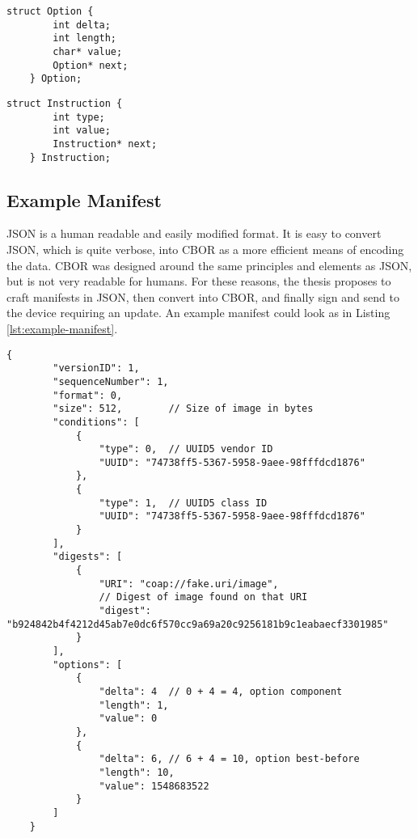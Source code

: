 \documentclass[0-thesis.tex]{subfiles}
\begin{document}
\begin{lstlisting}[caption={The format of the option field.}, 
                    label={lst:option-struct}]
    struct Option {
        int delta;
        int length;
        char* value;
        Option* next;
    } Option;
\end{lstlisting}

\begin{lstlisting}[caption={The format of directives or processing steps.}, 
                    label={lst:instruction}]
    struct Instruction {
        int type;
        int value;
        Instruction* next;
    } Instruction;
\end{lstlisting}

\subsection{Example Manifest}
\label{ssec:example-manifest}
JSON is a human readable and easily modified format. It is easy to convert JSON, which is
quite verbose, into CBOR as a more efficient means of encoding the data. CBOR was designed
around the same principles and elements as JSON, but is not very readable for humans. For
these reasons, the thesis proposes to craft manifests in JSON, then convert into CBOR, and
finally sign and send to the device requiring an update. An example manifest could look as
in Listing \ref{lst:example-manifest}.

\begin{lstlisting}[caption={An example manifest.},
                    label={lst:example-manifest}]
    {
        "versionID": 1,
        "sequenceNumber": 1,
        "format": 0,
        "size": 512,        // Size of image in bytes
        "conditions": [
            {
                "type": 0,  // UUID5 vendor ID
                "UUID": "74738ff5-5367-5958-9aee-98fffdcd1876"
            },
            {
                "type": 1,  // UUID5 class ID
                "UUID": "74738ff5-5367-5958-9aee-98fffdcd1876"
            }
        ],
        "digests": [
            {
                "URI": "coap://fake.uri/image",
                // Digest of image found on that URI
                "digest": "b924842b4f4212d45ab7e0dc6f570cc9a69a20c9256181b9c1eabaecf3301985"
            }
        ],
        "options": [
            {
                "delta": 4  // 0 + 4 = 4, option component
                "length": 1,
                "value": 0
            },
            {
                "delta": 6, // 6 + 4 = 10, option best-before
                "length": 10,
                "value": 1548683522
            }
        ]
    }
\end{lstlisting}
\end{document}
